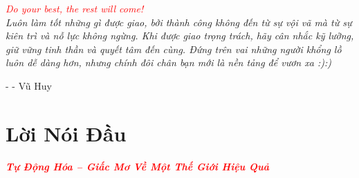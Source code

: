 \documentclass[a4paper,12pt,oneside]{book}
\begin{document}
\vspace{2cm}

\begin{center}
    \textit{\textcolor{red}{Do your best, the rest will come!}\\
    Luôn làm tốt những gì được giao, bởi thành công không đến từ sự vội vã mà từ sự kiên trì và nỗ lực không ngừng. Khi được giao trọng trách, hãy cân nhắc kỹ lưỡng, giữ vững tinh thần và quyết tâm đến cùng. Đứng trên vai những người khổng lồ luôn dễ dàng hơn, nhưng chính đôi chân bạn mới là nền tảng để vươn xa :):)}

    \vspace{0.5cm}
    \hspace{10cm}
    - - Vũ Huy
\end{center}

\newpage

\chapter*{Lời Nói Đầu}
\fontsize{13pt}{16pt}\selectfont
\begin{center}
    \textit{\textcolor{red}{\textbf{Tự Động Hóa – Giấc Mơ Về Một Thế Giới Hiệu Quả}}}
\end{center}
\end{document}
